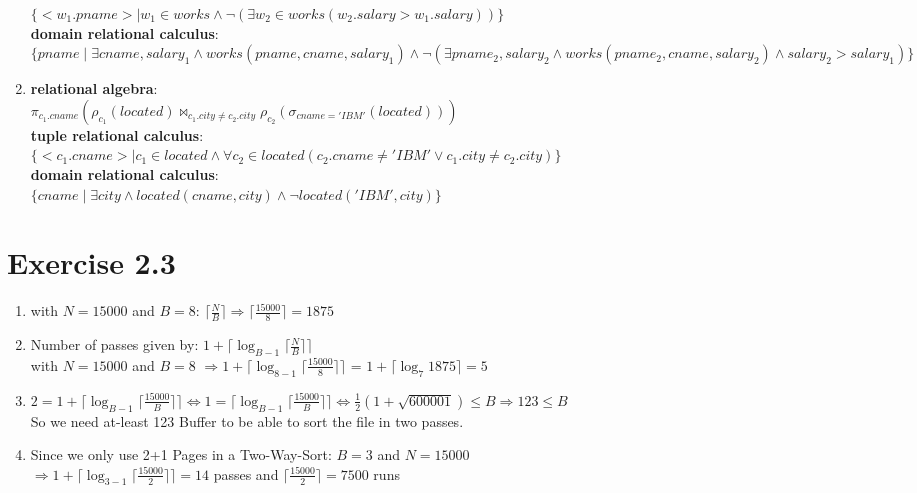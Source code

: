 \documentclass[12pt]{article}
\begin{document}
\begin{enumerate}[label = 2.2.\arabic*]
			$\{ <w_1.pname> \mid w_1 \in works \land \lnot(\exists w_2 \in works( w_2.salary > w_1.salary ))\} $ \\
			\textbf{domain relational calculus}:\\
			$\{ pname \mid \exists cname, salary_1 \land works(pname,cname,salary_1) \land \lnot(\exists pname_2, salary_2 \land works(pname_2,cname,salary_2) \land salary_2 > salary_1  )\} $ \\
		\item 
			\textbf{relational algebra}:\\
			$\pi_{c_1.cname}( \rho_{c_1}(located) \bowtie_{c_1.city \neq c_2.city} \rho_{c_2}(\sigma_{cname='IBM'}(located)) ) $ \\
			\textbf{tuple relational calculus}:\\
			$\{ <c_1.cname> \mid c_1\in located \land \forall c_2\in located (c_2.cname \neq 'IBM' \lor c_1.city \neq c_2.city) \} $ \\
			\textbf{domain relational calculus}:\\
			$\{ cname \mid \exists city \land located(cname, city) \land \lnot located('IBM', city)\}$ \\
	\end{enumerate}

	\section{Exercise 2.3}
	\begin{enumerate}[label=2.3.\arabic*]
		\item with $N=15000$ and $B=8$: $\lceil \frac{N}{B} \rceil \Rightarrow \lceil \frac{15000}{8} \rceil = 1875$
		\item Number of passes given by: $1+\lceil \log_{B-1}\lceil \frac{N}{B} \rceil \rceil$\\
			  with $N=15000$ and $B=8$ $\Rightarrow 1+\lceil \log_{8-1}\lceil \frac{15000}{8} \rceil \rceil$ = $1+\lceil \log_7 1875 \rceil = 5 $
		\item $ 2 = 1+\lceil \log_{B-1}\lceil \frac{15000}{B} \rceil \rceil \Leftrightarrow 1 = \lceil \log_{B-1}\lceil \frac{15000}{B} \rceil \rceil \Leftrightarrow \frac{1}{2}(1+\sqrt{600001}) \le B \Rightarrow 123 \le B$ \\
		So we need at-least 123 Buffer to be able to sort the file in two passes. %
		\item Since we only use 2+1 Pages in a Two-Way-Sort: $B=3$ and $N=15000$ \\ $\Rightarrow 1+\lceil \log_{3-1}\lceil \frac{15000}{2} \rceil \rceil = 14$ passes 
			and $ \lceil \frac{15000}{2} \rceil = 7500$ runs
		
	\end{enumerate}
\end{document}
